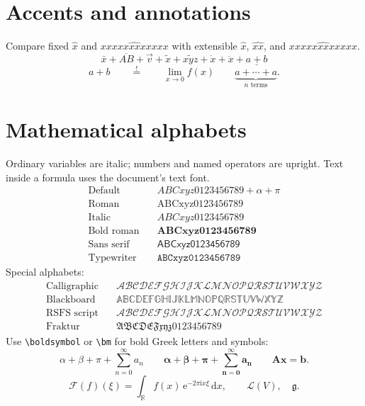\documentclass[12pt]{article}
\begin{document}
\section{Accents and annotations}
Compare fixed $\hat{x}$ and $\hat{xxxxxxxxxxxx}$ with extensible
$\widehat{x}$, $\widehat{xx}$, and $\widehat{xxxxxxxxxxxx}$.
\[
 \bar{x}+\overline{AB}+\vec{v}+\tilde{x}+\widetilde{xyz}
 +\dot{x}+\ddot{x}+\underline{a+b}
\]
\[
 \boxed{a+b}\qquad
 \overset{!}{=}\qquad \underset{x\to0}{\lim} f(x)\qquad
 \underbrace{a+\cdots+a}_{n\text{ terms}}.
\]

\section*{Mathematical alphabets}
Ordinary variables are italic; numbers and named operators are upright.
Text inside a formula uses the document's text font.
\[
 \begin{aligned}
  \text{Default}    &\quad ABCxyz0123456789+\alpha+\pi\\
  \text{Roman}      &\quad \mathrm{ABCxyz0123456789}\\
  \text{Italic}     &\quad \mathit{ABCxyz0123456789}\\
  \text{Bold roman} &\quad \mathbf{ABCxyz0123456789}\\
  \text{Sans serif} &\quad \mathsf{ABCxyz0123456789}\\
  \text{Typewriter} &\quad \mathtt{ABCxyz0123456789}
 \end{aligned}
\]
Special alphabets:
\[
 \begin{aligned}
  \text{Calligraphic}&\quad\mathcal{ABCDEFGHIJKLMNOPQRSTUVWXYZ}\\
  \text{Blackboard} &\quad\mathbb{ABCDEFGHIJKLMNOPQRSTUVWXYZ}\\
  \text{RSFS script}&\quad\mathscr{ABCDEFGHIJKLMNOPQRSTUVWXYZ}\\
  \text{Fraktur}    &\quad\mathfrak{ABCDEFxyz0123456789}
 \end{aligned}
\]
Use \verb|\boldsymbol| or \verb|\bm| for bold Greek letters and symbols:
\[
 \alpha+\beta+\pi+\sum_{n=0}^{\infty}a_n\qquad
 \boldsymbol{\alpha+\beta+\pi+\sum_{n=0}^{\infty}a_n}\qquad
 \mathbf{A}\bm{x}=\bm{b}.
\]
\[
 \mathscr{F}(f)(\xi)=
 \int_{\mathbb{R}}f(x)\,\mathrm{e}^{-2\pi\mathrm{i}x\xi}\,\mathrm{d}x,
 \qquad \mathcal{L}(V),\quad \mathfrak{g}.
\]
\end{document}
